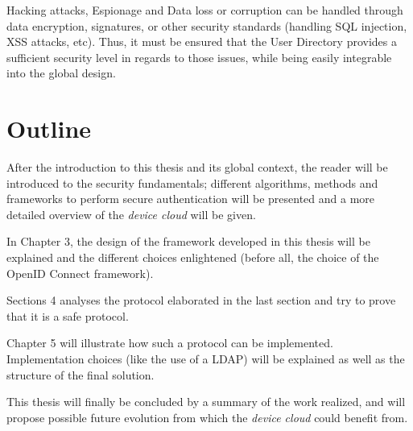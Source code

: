 Hacking attacks, Espionage and Data loss or corruption can be handled through data encryption, signatures, or other security standards (handling SQL injection, XSS attacks, etc). Thus, it must be ensured that the User Directory provides a sufficient security level in regards to those issues, while being easily integrable into the global design. 


\section{Outline}
After the introduction to this thesis and its global context, the reader will be introduced to the security fundamentals; different algorithms, methods and frameworks to perform secure authentication will be presented and a more detailed overview of the \emph{device cloud} will be given.

In Chapter 3, the design of the framework developed in this thesis will be explained and the different choices enlightened (before all, the choice of the OpenID Connect framework).

Sections 4 analyses the protocol elaborated in the last section and try to prove that it is a safe protocol.

Chapter 5 will illustrate how such a protocol can be implemented. Implementation choices (like the use of a LDAP) will be explained as well as the structure of the final solution.

This thesis will finally be concluded by a summary of the work realized, and will propose possible future evolution from which the \emph{device cloud} could benefit from.



